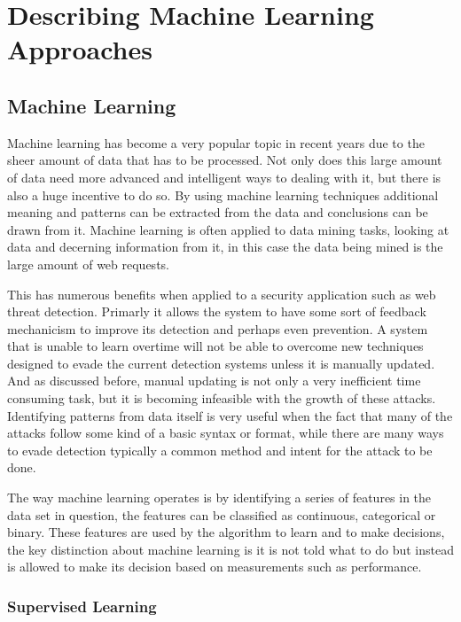 \chapter{Describing Machine Learning Approaches}

\section{Machine Learning}

Machine learning has become a very popular topic in recent years due to the sheer amount of data that has to be processed.  Not only does this large amount of data need more advanced and intelligent ways to dealing with it, but there is also a huge incentive to do so.  By using machine learning techniques additional meaning and patterns can be extracted from the data and conclusions can be drawn from it. %
Machine learning is often applied to data mining tasks, looking at data and decerning information from it, in this case the data being mined is the large amount of web requests.

This has numerous benefits when applied to a security application such as web threat detection.  Primarly it allows the system to have some sort of feedback mechanicism to improve its detection and perhaps even prevention.  A system that is unable to learn overtime will not be able to overcome new techniques designed to evade the current detection systems unless it is manually updated.  And as discussed before, manual updating is not only a very inefficient time consuming task, but it is becoming infeasible with the growth of these attacks.  Identifying patterns from data itself is very useful when the fact that many of the attacks follow some kind of a basic syntax or format, while there are many ways to evade detection typically a common method and intent for the attack to be done.

The way machine learning operates is by identifying a series of features in the data set in question, the features can be classified as continuous, categorical or binary.  These features are used by the algorithm to learn and to make decisions, the key distinction about machine learning is it is not told what to do but instead is allowed to make its decision based on measurements such as performance.   %
  
\subsection{Supervised Learning}

